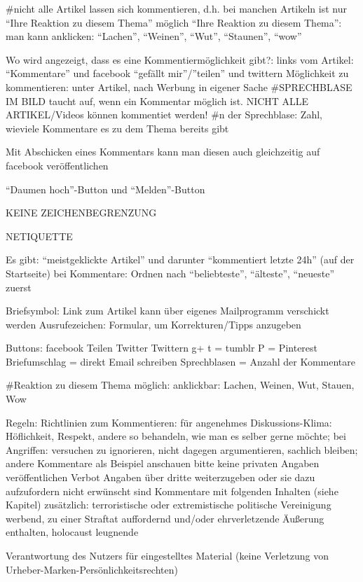 #nicht alle Artikel lassen sich kommentieren, d.h. bei manchen Artikeln ist nur ``Ihre Reaktion zu diesem Thema'' möglich 
``Ihre Reaktion zu diesem Thema'': man kann anklicken: ``Lachen'', ``Weinen'', ``Wut'', ``Staunen'', ``wow''


Wo wird angezeigt, dass es eine Kommentiermöglichkeit gibt?: links vom Artikel: ``Kommentare'' und facebook ``gefällt mir''/''teilen'' und twittern 
Möglichkeit zu kommentieren: unter Artikel, nach Werbung in eigener Sache
#SPRECHBLASE IM BILD taucht auf, wenn ein Kommentar möglich ist. NICHT ALLE ARTIKEL/Videos können kommentiet werden! 
#n der Sprechblase: Zahl, wieviele Kommentare es zu dem Thema bereits gibt

Mit Abschicken eines Kommentars kann man diesen auch gleichzeitig auf facebook veröffentlichen

``Daumen hoch''-Button und ``Melden''-Button


KEINE ZEICHENBEGRENZUNG

NETIQUETTE

Es gibt: ``meistgeklickte Artikel'' und darunter ``kommentiert letzte 24h'' (auf der Startseite)
bei Kommentare: Ordnen nach ``beliebteste'', ``älteste'', ``neueste'' zuerst

Briefsymbol: Link zum Artikel kann über eigenes Mailprogramm verschickt werden
Ausrufezeichen: Formular, um Korrekturen/Tipps anzugeben

Buttons:
facebook Teilen
Twitter Twittern
g+
t = tumblr
P = Pinterest
Briefumschlag = direkt Email schreiben
Sprechblasen = Anzahl der Kommentare


#Reaktion zu diesem Thema möglich: anklickbar: Lachen, Weinen, Wut, Stauen, Wow


Regeln: Richtlinien zum Kommentieren:
	für angenehmes Diskussions-Klima: Höflichkeit, Respekt, andere so behandeln, wie man es selber gerne möchte; bei Angriffen: versuchen zu ignorieren, nicht 			dagegen argumentieren, sachlich bleiben; andere Kommentare als Beispiel anschauen
	bitte keine privaten Angaben veröffentlichen
	Verbot Angaben über dritte weiterzugeben oder sie dazu aufzufordern
	nicht erwünscht sind Kommentare mit folgenden Inhalten (siehe Kapitel)
	zusätzlich: terroristische oder extremistische politische Vereinigung werbend, zu einer Straftat auffordernd und/oder ehrverletzende Äußerung enthalten, holocaust leugnende


	Verantwortung des Nutzers für eingestelltes Material (keine Verletzung von Urheber-Marken-Persönlichkeitsrechten)


